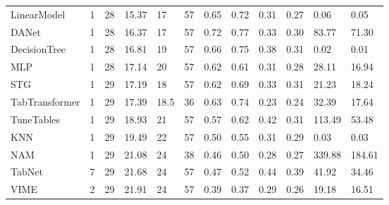 \begin{tabular}{lllllrllllll}
LinearModel & 1 & 28 & 15.37 & 17 & 57 & 0.65 & 0.72 & 0.31 & 0.27 & 0.06 & 0.05 \\
DANet & 1 & 28 & 16.37 & 17 & 57 & 0.72 & 0.77 & 0.33 & 0.30 & 83.77 & 71.30 \\
DecisionTree & 1 & 28 & 16.81 & 19 & 57 & 0.66 & 0.75 & 0.38 & 0.31 & 0.02 & 0.01 \\
MLP & 1 & 28 & 17.14 & 20 & 57 & 0.62 & 0.61 & 0.31 & 0.28 & 28.11 & 16.94 \\
STG & 1 & 29 & 17.19 & 18 & 57 & 0.62 & 0.69 & 0.33 & 0.31 & 21.23 & 18.24 \\
TabTransformer & 1 & 29 & 17.39 & 18.5 & 36 & 0.63 & 0.74 & 0.23 & 0.24 & 32.39 & 17.64 \\
TuneTables & 1 & 29 & 18.93 & 21 & 57 & 0.57 & 0.62 & 0.42 & 0.31 & 113.49 & 53.48 \\
KNN & 1 & 29 & 19.49 & 22 & 57 & 0.50 & 0.55 & 0.31 & 0.29 & 0.03 & 0.03 \\
NAM & 1 & 29 & 21.08 & 24 & 38 & 0.46 & 0.50 & 0.28 & 0.27 & 339.88 & 184.61 \\
TabNet & 7 & 29 & 21.68 & 24 & 57 & 0.47 & 0.52 & 0.44 & 0.39 & 41.92 & 34.46 \\
VIME & 2 & 29 & 21.91 & 24 & 57 & 0.39 & 0.37 & 0.29 & 0.26 & 19.18 & 16.51 \\
\bottomrule
\end{tabular}
